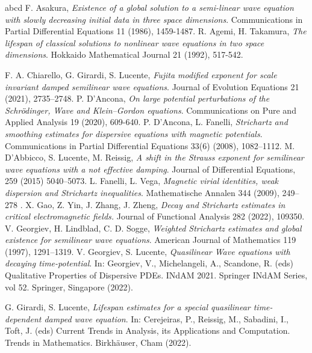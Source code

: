 \documentclass[11pt,reqno]{amsart}
\theoremstyle{definition}
\numberwithin{equation}{section}
\begin{document}
\begin{thebibliography}{abcd}
 F. Asakura, {\it Existence of a global solution to a semi-linear wave equation with slowly decreasing initial data in three space dimensions}. Communications in  Partial Differential Equations 11 (1986), 1459-1487.
 R. Agemi, H. Takamura, {\it The lifespan of classical solutions to nonlinear wave equations in two
space dimensions}. Hokkaido Mathematical Journal 21 (1992), 517-542.

 F. A. Chiarello, G. Girardi, S. Lucente, {\it Fujita modified exponent for scale invariant damped semilinear wave equations}.  Journal of Evolution Equations 21 (2021), 2735–2748.
%
 P. D'Ancona, { \it On large potential perturbations of the Schrödinger, Wave and Klein–Gordon equations}. Communications on Pure and Applied Analysis 19 (2020), 609-640. 
 P. D’Ancona, L. Fanelli, {\it Strichartz and smoothing estimates for dispersive equations with magnetic potentials}. Communications in Partial Differential Equations 33(6) (2008), 1082–1112.
%
 M. D’Abbicco, S. Lucente, M. Reissig,  {\it A shift in the Strauss exponent for semilinear wave equations with a not effective damping}. Journal of Differential Equations, 259 (2015) 5040--5073.
 L. Fanelli, L. Vega, {\it Magnetic virial identities, weak dispersion and Strichartz inequalities}. Mathematische Annalen  344 (2009), 249–278 . 
 X. Gao, Z.  Yin, J.  Zhang, J. Zheng, {\it Decay and Strichartz estimates in critical electromagnetic fields.}
Journal of Functional Analysis 282 (2022), 109350.
 V. Georgiev, H. Lindblad, C. D. Sogge, {\it Weighted Strichartz estimates and global existence for semilinear wave equations}. American Journal of Mathematics 119 (1997), 1291–1319.
 V. Georgiev, S. Lucente, {\it Quasilinear Wave equations with decaying time-potential}. In: Georgiev, V., Michelangeli, A., Scandone, R. (eds) Qualitative Properties of Dispersive PDEs. INdAM 2021. Springer INdAM Series, vol 52. Springer, Singapore  (2022). 

 G. Girardi, S. Lucente, {\it Lifespan estimates for a special quasilinear time-dependent damped wave equation}. In: Cerejeiras, P., Reissig, M., Sabadini, I., Toft, J. (eds) Current Trends in Analysis, its Applications and Computation. Trends in Mathematics. Birkhäuser, Cham (2022). 


\end{thebibliography}
\end{document}
